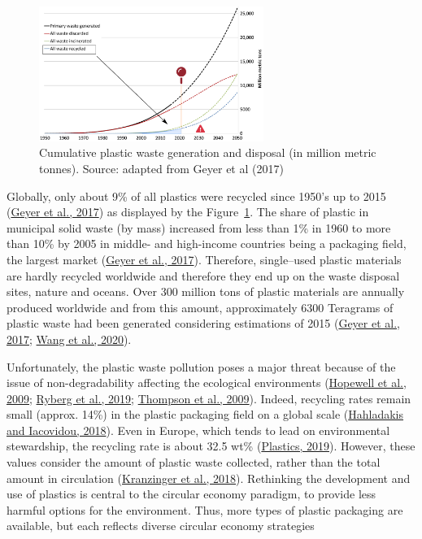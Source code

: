 \documentclass[
  11pt,
]{article}
\begin{document}
\begin{figure}[H]

{\centering \includegraphics[width=0.65\textwidth,height=\textheight]{figures/Plastic-problem.png}

}

\caption{\label{fig-plastic-problem}Cumulative plastic waste generation
and disposal (in million metric tonnes). Source: adapted from Geyer et
al (2017)}

\end{figure}

Globally, only about 9\% of all plastics were recycled since 1950's up
to 2015 (\protect\hyperlink{ref-Geyer2017}{Geyer et al., 2017}) as
displayed by the Figure~\ref{fig-plastic-problem}. The share of plastic
in municipal solid waste (by mass) increased from less than 1\% in 1960
to more than 10\% by 2005 in middle- and high-income countries being a
packaging field, the largest market
(\protect\hyperlink{ref-Geyer2017}{Geyer et al., 2017}). Therefore,
single--used plastic materials are hardly recycled worldwide and
therefore they end up on the waste disposal sites, nature and oceans.
Over 300 million tons of plastic materials are annually produced
worldwide and from this amount, approximately 6300 Teragrams of plastic
waste had been generated considering estimations of 2015
(\protect\hyperlink{ref-Geyer2017}{Geyer et al., 2017};
\protect\hyperlink{ref-Wang2020a}{Wang et al., 2020}).

Unfortunately, the plastic waste pollution poses a major threat because
of the issue of non-degradability affecting the ecological environments
(\protect\hyperlink{ref-Hopewell2009}{Hopewell et al., 2009};
\protect\hyperlink{ref-Ryberg2019}{Ryberg et al., 2019};
\protect\hyperlink{ref-Thompson2009b}{Thompson et al., 2009}). Indeed,
recycling rates remain small (approx. 14\%) in the plastic packaging
field on a global scale
(\protect\hyperlink{ref-Hahladakis2018}{Hahladakis and Iacovidou,
2018}). Even in Europe, which tends to lead on environmental
stewardship, the recycling rate is about 32.5 wt\%
(\protect\hyperlink{ref-Plastics2019}{Plastics, 2019}). However, these
values consider the amount of plastic waste collected, rather than the
total amount in circulation
(\protect\hyperlink{ref-Kranzinger2018}{Kranzinger et al., 2018}).
Rethinking the development and use of plastics is central to the
circular economy paradigm, to provide less harmful options for the
environment. Thus, more types of plastic packaging are available, but
each reflects diverse circular economy strategies
\end{document}
